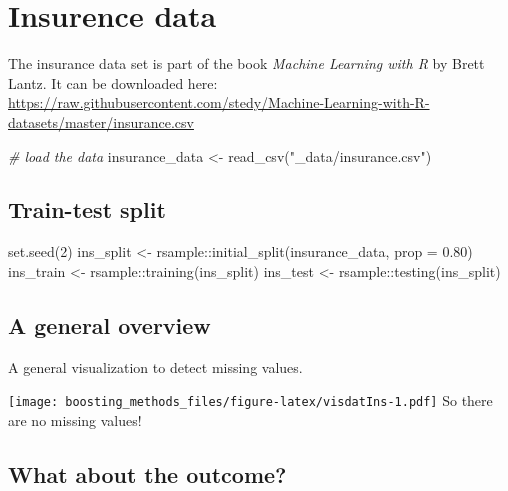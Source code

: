 \documentclass[
]{book}
\newenvironment{Shaded}{\begin{snugshade}}{\end{snugshade}}
\newcommand{\AttributeTok}[1]{\textcolor[rgb]{0.77,0.63,0.00}{#1}}
\newcommand{\CommentTok}[1]{\textcolor[rgb]{0.56,0.35,0.01}{\textit{#1}}}
\newcommand{\DecValTok}[1]{\textcolor[rgb]{0.00,0.00,0.81}{#1}}
\newcommand{\FloatTok}[1]{\textcolor[rgb]{0.00,0.00,0.81}{#1}}
\newcommand{\FunctionTok}[1]{\textcolor[rgb]{0.00,0.00,0.00}{#1}}
\newcommand{\NormalTok}[1]{#1}
\newcommand{\OtherTok}[1]{\textcolor[rgb]{0.56,0.35,0.01}{#1}}
\newcommand{\SpecialCharTok}[1]{\textcolor[rgb]{0.00,0.00,0.00}{#1}}
\newcommand{\StringTok}[1]{\textcolor[rgb]{0.31,0.60,0.02}{#1}}
\begin{document}
\hypertarget{insurence-data}{%
\section{Insurence data}\label{insurence-data}}

The insurance data set is part of the book \emph{Machine Learning with R} by Brett Lantz. It can be downloaded here:
\url{https://raw.githubusercontent.com/stedy/Machine-Learning-with-R-datasets/master/insurance.csv}

\begin{Shaded}
\begin{Highlighting}[]
\CommentTok{\# load the data}
\NormalTok{insurance\_data }\OtherTok{\textless{}{-}} \FunctionTok{read\_csv}\NormalTok{(}\StringTok{"\_data/insurance.csv"}\NormalTok{)}
\end{Highlighting}
\end{Shaded}

\hypertarget{train-test-split-1}{%
\subsection{Train-test split}\label{train-test-split-1}}

\begin{Shaded}
\begin{Highlighting}[]
\FunctionTok{set.seed}\NormalTok{(}\DecValTok{2}\NormalTok{)}
\NormalTok{ins\_split }\OtherTok{\textless{}{-}}\NormalTok{ rsample}\SpecialCharTok{::}\FunctionTok{initial\_split}\NormalTok{(insurance\_data, }\AttributeTok{prop =} \FloatTok{0.80}\NormalTok{)}
\NormalTok{ins\_train }\OtherTok{\textless{}{-}}\NormalTok{ rsample}\SpecialCharTok{::}\FunctionTok{training}\NormalTok{(ins\_split)}
\NormalTok{ins\_test  }\OtherTok{\textless{}{-}}\NormalTok{ rsample}\SpecialCharTok{::}\FunctionTok{testing}\NormalTok{(ins\_split)}
\end{Highlighting}
\end{Shaded}

\hypertarget{a-general-overview}{%
\subsection{A general overview}\label{a-general-overview}}

A general visualization to detect missing values.

\texttt{[image: boosting\_methods\_files/figure-latex/visdatIns-1.pdf]}
So there are no missing values!

\hypertarget{what-about-the-outcome}{%
\subsection{What about the outcome?}\label{what-about-the-outcome}}
\end{document}
